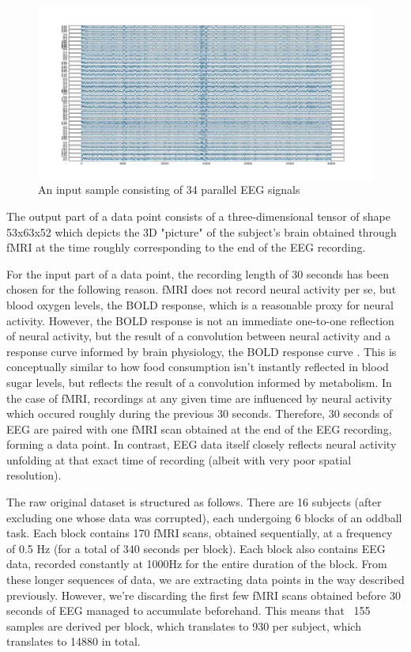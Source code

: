 \documentclass{article}
\begin{document}
\begin{figure}[h]
    \centering
    \includegraphics[width=\textwidth]{eeg.png}
    \caption{An input sample consisting of 34 parallel EEG signals}
    \label{fig:eeg}
\end{figure}

The output part of a data point consists of a three-dimensional tensor of shape 53x63x52 which depicts the 3D "picture" of the subject's brain obtained through fMRI at the time roughly corresponding to the end of the EEG recording.

For the input part of a data point, the recording length of 30 seconds has been chosen for the following reason. fMRI does not record neural activity per se, but blood oxygen levels, the BOLD response, which is a reasonable proxy for neural activity. However, the BOLD response is not an immediate one-to-one reflection of neural activity, but the result of a convolution between neural activity and a response curve informed by brain physiology, the BOLD response curve \cite{noauthor_functional_1993}. This is conceptually similar to how food consumption isn't instantly reflected in blood sugar levels, but reflects the result of a convolution informed by metabolism. In the case of fMRI, recordings at any given time are influenced by neural activity which occured roughly during the previous 30 seconds. Therefore, 30 seconds of EEG are paired with one fMRI scan obtained at the end of the EEG recording, forming a data point. In contrast, EEG data itself closely reflects neural activity unfolding at that exact time of recording (albeit with very poor spatial resolution).

The raw original dataset is structured as follows. There are 16 subjects (after excluding one whose data was corrupted), each undergoing 6 blocks of an oddball task. Each block contains 170 fMRI scans, obtained sequentially, at a frequency of 0.5 Hz (for a total of 340 seconds per block). Each block also contains EEG data, recorded constantly at 1000Hz for the entire duration of the block. From these longer sequences of data, we are extracting data points in the way described previously. However, we're discarding the first few fMRI scans obtained before 30 seconds of EEG managed to accumulate beforehand. This means that ~155 samples are derived per block, which translates to 930 per subject, which translates to 14880 in total.
\end{document}
